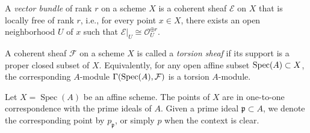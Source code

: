 \documentclass[12pt]{article}
\begin{document}
\begin{definition}
    A \textit{vector bundle} of rank $r$ on a scheme $X$ is a coherent sheaf $\mathcal{E}$ on $X$ that is locally free of rank $r$, i.e., for every point $x \in X$, there exists an open neighborhood $U$ of $x$ such that $\mathcal{E}|_U \cong \mathcal{O}_U^{\oplus r}$.
\end{definition}

\begin{definition}
    A coherent sheaf $\mathcal{F}$ on a scheme $X$ is called a \textit{torsion sheaf} if its support is a proper closed subset of $X$. Equivalently, for any open affine subset $\operatorname{Spec}(A) \subset X$, the corresponding $A$-module $\Gamma(\operatorname{Spec}(A), \mathcal{F})$ is a torsion $A$-module.
\end{definition}


\begin{definition}
    Let $X = \operatorname{Spec}(A)$ be an affine scheme. The points of $X$ are in one-to-one correspondence with the prime ideals of $A$. Given a prime ideal $\mathfrak{p} \subset A$, we denote the corresponding point by $p_{\mathfrak{p}}$, or simply $p$ when the context is clear.
\end{definition}
\end{document}

